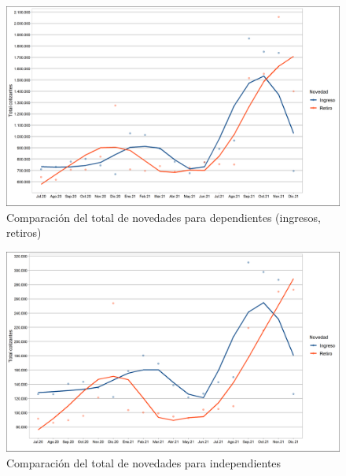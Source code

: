 \begin{figure}
\label{fig:Cap22:Novedad_1}%
\includegraphics[width = 11.5cm]{figures/Capitulo_2_2/total_novedades_dependientes_1.png}
\caption{Comparación del total de novedades para dependientes (ingresos, retiros)}
\label{figura:novedad:sectorprivado:IR}
\end{figure}

\lipsum[2-4]

\begin{figure}
\label{fig:Cap22:Novedad_2}
\includegraphics[width = 11.5cm]{figures/Capitulo_2_2/total_novedades_independientes_1.png}
\caption{Comparación del total de novedades para independientes}
\label{figura:novedad:sectorprivado:IR}
\end{figure}

\lipsum[2-5]

